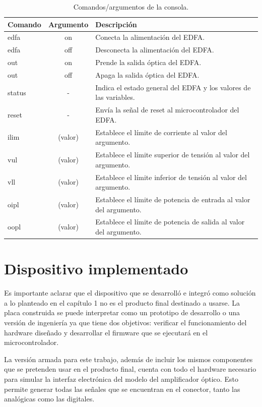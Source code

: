 \begin{table}[H]
	\centering
	\caption{Comandos/argumentos de la consola.}
	\begin{tabular}{l c p{8cm}}
		\toprule
		\textbf{Comando} & \textbf{Argumento} & \textbf{Descripción} \\
		\midrule
		edfa	& on & Conecta la alimentación del EDFA.	\\
		edfa	& off & Desconecta la alimentación del EDFA. \\
		out	& on & Prende la salida óptica del EDFA. \\
		out   & off & Apaga la salida óptica del EDFA. \\
		status & - & Indica el estado general del EDFA y los valores de las variables. \\
		reset & - & Envía la señal de reset al microcontrolador del EDFA. \\
		ilim	& (valor) & Establece el límite de corriente al valor del argumento. \\
		vul	& (valor) & Establece el límite superior de tensión al valor del argumento. \\
		vll		& (valor) & Establece el límite inferior de tensión al valor del argumento. \\
		oipl	& (valor) & Establece el límite de potencia de entrada al valor del argumento. \\
		oopl & (valor) & Establece el límite de potencia de salida al valor del argumento. \\
		\bottomrule
		\hline
	\end{tabular}
	\label{tab:tablacmd}
\end{table}

\section{Dispositivo implementado}
\label{sec:dispImp}

Es importante aclarar que el dispositivo que se desarrolló e integró como solución a lo planteado en el capítulo 1 no es el producto final destinado a usarse. La placa construida se puede interpretar como un prototipo de desarrollo o una versión de ingeniería ya que tiene dos objetivos: verificar el funcionamiento del hardware diseñado y desarrollar el firmware que se ejecutará en el microcontrolador. 

La versión armada para este trabajo, además de incluir los mismos componentes que se pretenden usar en el producto final, cuenta con todo el hardware necesario para simular la interfaz electrónica del modelo del amplificador óptico. Esto permite generar todas las señales que se encuentran en el conector, tanto las analógicas como las digitales.

